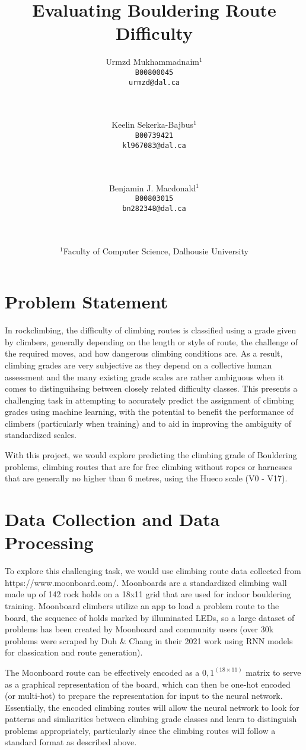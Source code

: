 \documentclass[10pt]{article}
\title{Evaluating Bouldering Route Difficulty}
\author{ Urmzd
  Mukhammadnaim$^1$\\ \texttt{B00800045} \\ \texttt{urmzd@dal.ca} \\ \\ \\ 
  \and
  Keelin Sekerka-Bajbus$^1$\\ \texttt{B00739421}\\ \texttt{kl967083@dal.ca}\\
  \\ \\ 
  \and Benjamin J. Macdonald$^1$\\ \texttt{B00803015}\\
\texttt{bn282348@dal.ca}\\ \\ \\ }
\date{$^1$Faculty of Computer Science, Dalhousie University}
\begin{document}
 \maketitle

\section{Problem Statement}
In rockclimbing, the difficulty of climbing routes
is classified using a grade given by climbers, generally depending on the
length or style of route, the challenge of the required moves, and how
dangerous climbing conditions are. As a result, climbing grades are very
subjective as they depend on a collective human assessment and the many
existing grade scales are rather ambiguous when it comes to distinguihsing
between closely related difficulty classes. This presents a challenging task in
attempting to accurately predict the assignment of climbing grades using
machine learning, with the potential to benefit the performance of climbers
(particularly when training) and to aid in improving the ambiguity of
standardized scales.

With this project, we would explore predicting the climbing grade of Bouldering
problems, climbing routes that are for free climbing without ropes or harnesses
that are generally no higher than 6 metres, using the Hueco scale (V0 - V17).

\section{Data Collection and Data Processing}

To explore this challenging task, we would use climbing route data collected
from https://www.moonboard.com/. Moonboards are a standardized climbing wall
made up of 142 rock holds on a 18x11 grid that are used for indoor bouldering
training. Moonboard climbers utilize an app to load a problem route to the
board, the sequence of holds marked by illuminated LEDs, so a large dataset of
problems has been created by Moonboard and community users (over 30k problems
were scraped by Duh \& Chang in their 2021 work using RNN models for
classication and route generation).

The Moonboard route can be effectively encoded as a ${0, 1}^(18 \times 11)$ matrix to
serve as a graphical representation of the board, which can then be one-hot
encoded (or multi-hot) to prepare the representation for input to the neural
network. Essentially, the encoded climbing routes will allow the neural network
to look for patterns and simliarities between climbing grade classes and learn
to distinguish problems appropriately, particularly since the climbing routes
will follow a standard format as described above.
\end{document}
